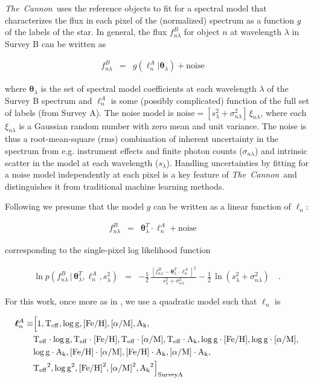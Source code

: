 \documentclass[12pt, letterpaper, preprint]{aastex}
\newcommand{\tc}{\textsl{The~Cannon}}
\newcommand{\set}[1]{\bm{#1}}
\newcommand{\teff}{\mbox{$\rm T_{eff}$}}
\newcommand{\feh}{\mbox{$\rm [Fe/H]$}}
\newcommand{\alpham}{\mbox{$\rm [\alpha/M]$}}
\newcommand{\logg}{\mbox{$\rm \log g$}}
\newcommand{\ak}{\mbox{$\rm A_k$}}
\newcommand{\starlabel}{\ell}
\newcommand{\starlabelvec}{\set{\starlabel}}
\newcommand{\given}{\,|\,}
\begin{document}
\tc\ uses the reference objects to fit for a spectral model that characterizes the flux
in each pixel of the (normalized) spectrum as a function $g$ of the labels of the star. 
In general, the flux $f_{n\lambda}^B$ for object $n$ at wavelength $\lambda$ in Survey B can be written as

\begin{eqnarray}
f_{n\lambda}^B &=&
g(\starlabelvec^A_n |  \set{\theta}_\lambda) + \mbox{noise}
\label{eq:specmodel}\quad 
\end{eqnarray}

\noindent where $\set{\theta}_\lambda$ is the set of 
spectral model coefficients at each wavelength $\lambda$ of the Survey B spectrum and
$\starlabelvec^A_n$ is some (possibly complicated) function of the full set of labels (from Survey A). 
The noise model is $\mbox{noise} = [s_\lambda^2+ \sigma_{n\lambda}^2]\,\xi_{n\lambda}$,
where each $\xi_{n\lambda}$ is a Gaussian random number with zero mean and unit variance. 
The noise is thus a root-mean-square (rms) combination of inherent uncertainty in the spectrum
from e.g. instrument effects and finite photon counts ($\sigma_{n\lambda}$) and 
intrinsic scatter in the model at each wavelength ($s_\lambda$). 
Handling uncertainties by fitting for a noise model
independently at each pixel is a key feature of \tc\ and 
distinguishes it from traditional machine learning methods. 

Following \citet{Ness2015} we presume that the model $g$ can be written 
 as a linear function of $\starlabelvec_n$: 

\begin{eqnarray}
f_{n\lambda}^B &=&
\set{\theta}_\lambda^T \cdot \starlabelvec^A_n + \mbox{noise}
\label{eq:linearmodel}\quad
\end{eqnarray}

\noindent corresponding to the single-pixel log likelihood function

\begin{eqnarray}
\ln p(f_{n\lambda}^B\given\set{\theta}^T_\lambda, \starlabelvec^A_n, s_\lambda^2) &=&
 -\frac{1}{2}\,\frac{[f_{n\lambda}^B - \set{\theta}^T_\lambda \cdot \starlabelvec^A_n]^2}{s_\lambda^2 + \sigma_{n\lambda}^2}
 -\frac{1}{2}\,\ln(s_\lambda^2 + \sigma_{n\lambda}^2)
\label{eq:like}\quad.
\end{eqnarray}

\noindent For this work, once more as in \citet{Ness2015}, 
we use a quadratic model such that $\starlabelvec_n$ is  

\begin{equation}
\begin{aligned}
\starlabelvec^A_n \equiv 
& \Bigl [1, \teff, \logg, \feh, \alpham, \ak, \\
& \teff\cdot\logg, \teff\cdot\feh, \teff\cdot\alpham, \teff\cdot\ak, \logg\cdot\feh, \logg\cdot\alpham, \\
& \logg\cdot\ak, \feh\cdot\alpham, \feh\cdot\ak,
\alpham\cdot\ak, \\
& \teff^2, \logg^2, \feh^2, \alpham^2, \ak^2  \Bigr 
]_{\mathrm{Survey A}}
\label{eq:quadinthreelabels}
\end{aligned}
\end{equation}
\end{document}
